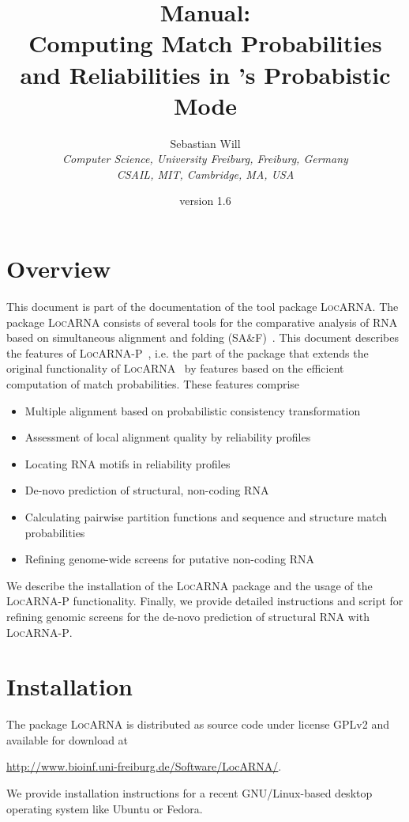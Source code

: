 \documentclass{article}
\title{\LocARNAP{} Manual:\\ Computing Match Probabilities and
  Reliabilities in \LocARNA{}'s Probabistic Mode}
\author{Sebastian Will\\[6pt]
\normalsize
  \emph{Computer Science, University Freiburg, Freiburg, Germany}\\
\normalsize
  \emph{CSAIL, MIT, Cambridge, MA, USA}
}
\date{\LocARNA{} version 1.6}
\newcommand{\LocARNA}{\textsc{LocARNA}}
\newcommand{\LocARNAP}{\textsc{LocARNA-P}}
\begin{document}
\maketitle

\section*{Overview}

This document is part of the documentation of the tool package
\LocARNA{}. The package \LocARNA{} consists of several tools for the
comparative analysis of RNA based on simultaneous alignment and
folding (SA\&F)~\cite{sankoff85}. This document describes the features
of \LocARNAP{}~\cite{Will:LocARNAP:unpublished}, i.e. the part of the package that
extends the original functionality of \LocARNA{}~\cite{Will:etal:_infer_non_codin_rna_famil:PLOS2007} by
features based on the efficient computation of match
probabilities. These features comprise
\begin{itemize}
\item Multiple alignment based on probabilistic consistency
  transformation
\item Assessment of local alignment quality by reliability profiles
\item Locating RNA motifs in reliability profiles
\item De-novo prediction of structural, non-coding RNA
\item Calculating pairwise partition functions and sequence and
  structure match probabilities
\item Refining genome-wide screens for putative non-coding RNA
\end{itemize}

We describe the installation of the \LocARNA{} package and the usage
of the \LocARNAP{} functionality. Finally, we provide detailed
instructions and script for refining genomic screens for the de-novo
prediction of structural RNA with \LocARNAP{}.

\section{Installation}

The package \LocARNA{} is distributed as source code under license
GPLv2 and available for download at
\begin{center}
  \url{http://www.bioinf.uni-freiburg.de/Software/LocARNA/}.
\end{center}
%
We provide installation instructions for a recent GNU/Linux-based
desktop operating system like Ubuntu or Fedora. 
\end{document}
